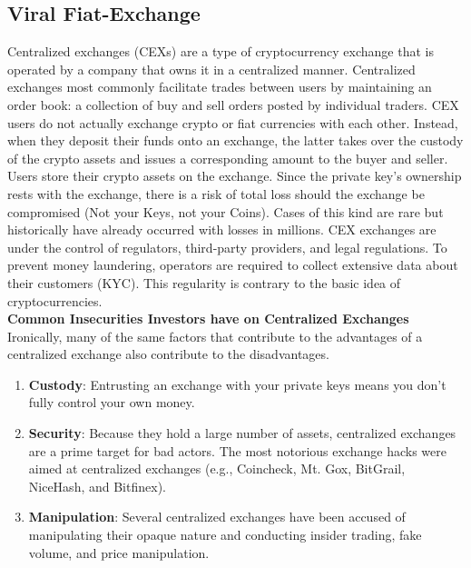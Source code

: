 \documentclass[10pt]{article}
\begin{document}
\newpage

\subsection{Viral Fiat-Exchange}

Centralized exchanges (CEXs) are a type of cryptocurrency exchange that is operated by a company that owns it in a centralized manner. Centralized exchanges most commonly facilitate trades between users by maintaining an order book: a collection of buy and sell orders posted by individual traders. CEX users do not actually exchange crypto or fiat currencies with each other. Instead, when they deposit their funds onto an exchange, the latter takes over the custody of the crypto assets and issues a corresponding amount to the buyer and seller. Users store their crypto assets on the exchange. Since the private key's ownership rests with the exchange, there is a risk of total loss should the exchange be compromised (Not your Keys, not your Coins). Cases of this kind are rare but historically have already occurred with losses in millions. CEX exchanges are under the control of regulators, third-party providers, and legal regulations. To prevent money laundering, operators are required to collect extensive data about their customers (KYC). This regularity is contrary to the basic idea of cryptocurrencies.\\

\textbf{Common Insecurities Investors have on Centralized Exchanges}\\

Ironically, many of the same factors that contribute to the advantages of a centralized exchange also contribute to the disadvantages.
\begin{enumerate}[leftmargin=+0.2in]
\item \textbf{Custody}: Entrusting an exchange with your private keys means you don’t fully control your own money.

\item \textbf{Security}: Because they hold a large number of assets, centralized exchanges are a prime target for bad actors. The most notorious exchange hacks were aimed at centralized exchanges (e.g., Coincheck, Mt. Gox, BitGrail, NiceHash, and Bitfinex).

\item \textbf{Manipulation}: Several centralized exchanges have been accused of manipulating their opaque nature and conducting insider trading, fake volume, and price manipulation.
\end{enumerate}
\end{document}
